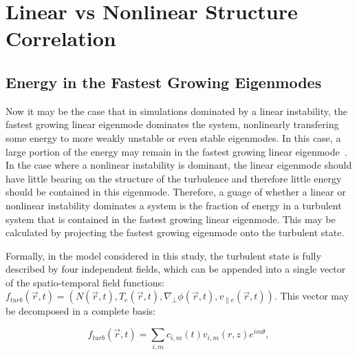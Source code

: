 \documentclass[showpacs,preprintnumbers,amsmath,amssymb,superscriptaddress,aip]{revtex4-1}
\def\beq{\begin{equation}}
\def\eeq{\end{equation}}
\def\grad{\nabla}
\newcommand{\gradperp}{\grad_\perp}
\newcommand{\vpe}{v_{\parallel e}}
\begin{document}
\section{Linear vs Nonlinear Structure Correlation}
\label{Sec_lin_vs_nl}
\subsection{Energy in the Fastest Growing Eigenmodes}
\label{subsec_en_eigenmodes}

Now it may be the case that in simulations dominated by a linear instability, the fastest growing linear
eigenmode dominates the system, nonlinearly transfering some energy to more weakly unstable or even stable eigenmodes. In this case, a large portion of the energy may remain in the fastest
growing linear eigenmode~\cite{hatch2011}. In the case where a nonlinear instability is dominant, the linear eigenmode should have little bearing on the structure of the turbulence and therefore little
energy should be contained in this eigenmode. Therefore, a guage of whether a linear or nonlinear instability dominates a system is the fraction of energy in a turbulent system
that is contained in the fastest growing linear eigenmode. This may be calculated by projecting the fastest growing eigenmode onto the turbulent state.

Formally, in the model considered in this study, the turbulent state is fully described by four independent fields, which can be appended into a single vector of the spatio-temporal field functions: 
$f_{turb}(\vec{r},t) = (N(\vec{r},t),T_e(\vec{r},t),\gradperp \phi(\vec{r},t), \vpe(\vec{r},t))$. This vector may be decomposed in a complete basis:

\beq
\label{basis_decomp}
f_{turb}(\vec{r},t) = \sum_{i,m} c_{i,m}(t) v_{i,m}(r,z) e^{i m \theta},
\eeq
\end{document}
